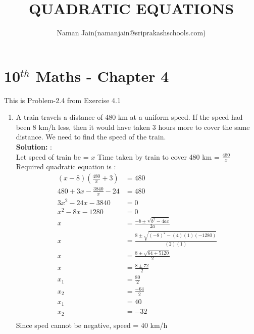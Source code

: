 \documentclass[12pt]{article}
\title{QUADRATIC EQUATIONS}
\author{Naman Jain(namanjain@sriprakashschools.com)}
\newcommand{\solution}{\noindent \textbf{Solution: }}
\begin{document}
    \maketitle
    \section*{10$^{th}$ Maths - Chapter 4}
    This is Problem-2.4 from Exercise 4.1
    \begin{enumerate}
    \item A train travels a distance of 480 km at a uniform speed. If the speed had been 8 km/h less, then it would have taken  3 hours more to cover the same distance. We need to find the speed of the train.\\
\solution:\\
Let speed of train be = $x$
Time taken by train to cover 480 km = $\frac{480}{x}$
Required quadratic equation is :
\begin{align}
(x-8)(\frac{480}{x}+3) &= 480\\
480+3x-\frac{3840}{x}-24 &= 480\\
3x^2-24x-3840&=0\\
x^2-8x-1280&=0\\
x&=\frac{-b\pm\sqrt{b^2-4ac}}{2a}\\
x&=\frac{8\pm\sqrt{(-8)^2-(4)(1)(-1280)}}{(2)(1)}\\
x&=\frac{8\pm\sqrt{64+5120}}{2}\\
x&=\frac{8\pm 72}{2}\\
x_1&=\frac{80}{2}\\
x_2&=\frac{-64}{2}\\
x_1&=40\\
x_2&=-32\\
\end{align}
Since sped cannot be negative, speed = 40 km/h\\
\end{enumerate}
\end{document}
